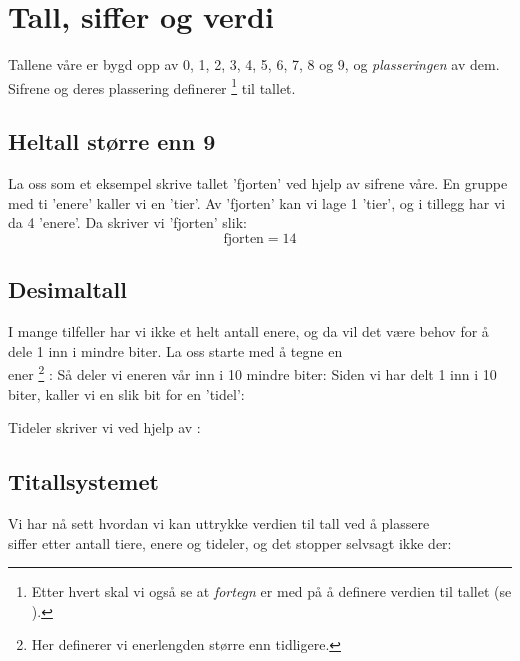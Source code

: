 \newpage
\section{Tall, siffer og verdi \label{tallsiff}}
Tallene våre er bygd opp av  
0, 1, 2, 3, 4, 5, 6, 7, 8 og 9, og \textsl{plasseringen} av dem. Sifrene og deres plassering definerer
\footnote{Etter hvert skal vi også se at \textit{fortegn} er med på å definere verdien til tallet (se ).}
{}  til tallet.
\subsection*{Heltall større enn 9}
La oss som et eksempel skrive tallet 'fjorten' ved hjelp av sifrene våre.
En gruppe med ti 'enere' kaller vi en 'tier'. Av 'fjorten' kan vi lage 1 'tier', og i tillegg har vi da 4 'enere'. Da skriver vi 'fjorten' slik:
\[ \text{fjorten}=14 \]
{} 
\vsk
\newpage
\subsection*{Desimaltall}
I mange tilfeller har vi ikke et helt antall enere, og da vil det være behov for å dele 1 inn i mindre biter. La oss starte med å tegne en\\ ener\!\!
\footnote{Her definerer vi enerlengden større enn tidligere.}
\!\!:
Så deler vi eneren vår inn i 10 mindre biter:
 \vs
{}
Siden vi har delt 1 inn i 10 biter, kaller vi en slik bit for en 'tidel':

Tideler skriver vi ved hjelp av   \sym{,}  :
\regv
{}

\newpage
\subsection*{Titallsystemet}
Vi har nå sett hvordan vi kan uttrykke verdien til tall ved å plassere \\siffer etter antall tiere, enere og tideler, og det stopper selvsagt ikke der: \regv

